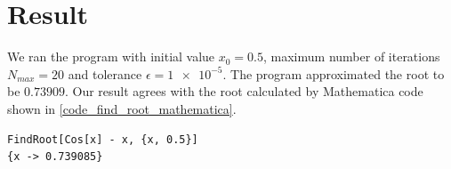 \section{Result}

We ran the program with initial value $x_0 = 0.5$, maximum number of iterations $N_{max}=20$ and tolerance $\epsilon=\num{1e-5}$. The program approximated the root to be $0.73909$. Our result agrees with the root calculated by Mathematica code shown in  \autoref{code_find_root_mathematica}.


\noindent\begin{minipage}{\linewidth}
\begin{lstlisting}[caption={Finding root of $\cos(x)-x = 0$ using Mathematica.},frame=tlrb,label={code_find_root_mathematica}]
FindRoot[Cos[x] - x, {x, 0.5}]
{x -> 0.739085}
\end{lstlisting}
\end{minipage}













